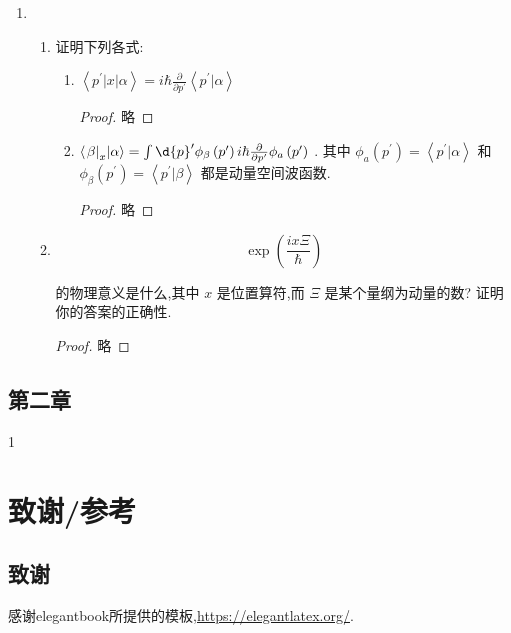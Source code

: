 \begin{enumerate}
\begin{enumerate}
		\begin{proof}
			略
		\end{proof}
	\end{enumerate}
	\item 
	\begin{enumerate}
		\item 证明下列各式:
		\begin{enumerate}
			\item $\left\langle {{p}^{\prime }\left| x\right| \alpha }\right\rangle = i\hbar \frac{\partial }{\partial {p}^{\prime }}\left\langle {{p}^{\prime } | \alpha }\right\rangle$
			\begin{proof}
				略
			\end{proof}
			\item $\left\langle {{\left. \beta \right| }_{x} | \alpha }\right\rangle = \int \d{p}^{\prime }{\phi }_{\beta }\left( {p}^{\prime }\right) i\hbar \frac{\partial }{\partial {p}^{\prime }}{\phi }_{a}\left( {p}^{\prime }\right)$ . 其中 ${\phi }_{a}\left( {p}^{\prime }\right) = \left\langle {{p}^{\prime } | \alpha }\right\rangle$ 和 ${\phi }_{\beta }\left( {p}^{\prime }\right) = \left\langle {{p}^{\prime } | \beta }\right\rangle$ 都是动量空间波函数.
			\begin{proof}
				略
			\end{proof}
		\end{enumerate}
		\item $$
		\exp \left( \frac{ix\Xi }{\hbar }\right)
		$$
		
		的物理意义是什么,其中 $x$ 是位置算符,而 $\Xi$ 是某个量纲为动量的数? 证明你的答案的正确性.
		\begin{proof}
			略
		\end{proof}
	\end{enumerate}
\end{enumerate}
\section{第二章}
1
\chapter{致谢/参考}
\section{致谢}
感谢elegantbook所提供的模板,\href{https://elegantlatex.org/}{https://elegantlatex.org/}.\\


